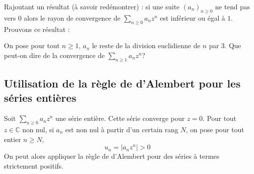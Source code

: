 \documentclass[french,11pt,twoside]{VcCours}
\begin{document}
%
%

\begin{Remarque}{} Rajoutant un résultat (à savoir redémontrer) : si une suite $(a_n)_{n \geq 0}$ ne tend pas vers $0$ alors le rayon de convergence de $\sum_{n \geq 0} a_n z^n$ est inférieur ou égal à $1$. Prouvons ce résultat : 

\vspace*{ 2cm}
\end{Remarque}

\begin{Exemple}{} On pose pour tout $n \geq 1$, $a_n$ le reste de la division euclidienne de $n$ par $3$. Que peut-on dire de la convergence de $\sum_{n \geq 1} a_n z^n$?

\vspace*{ 3cm}
\end{Exemple}

\subsection{Utilisation de la règle de d'Alembert pour les séries entières}
Soit $\sum_{n \geq 0} a_n z^n$ une série entière. Cette série converge pour $z=0$. Pour tout $z \in \mathbb{C}$ non nul, si $a_n$ est non nul à partir d'un certain rang $N$, on pose pour tout entier $n \geq N$,
$$ u_n = \vert a_n z^n \vert >0$$
On peut alors appliquer la règle de d'Alembert pour des séries à termes strictement positifs.

\medskip

%
\end{document}
